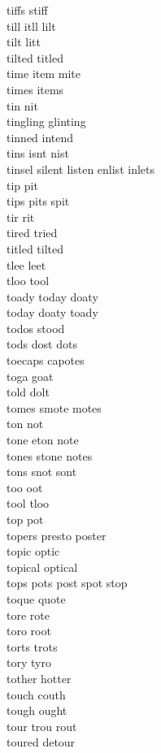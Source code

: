 tiffs stiff\\
till itll lilt\\
tilt litt\\
tilted titled\\
time item mite\\
times items\\
tin nit\\
tingling glinting\\
tinned intend\\
tins isnt nist\\
tinsel silent listen enlist inlets\\
tip pit\\
tips pits spit\\
tir rit\\
tired tried\\
titled tilted\\
tlee leet\\
tloo tool\\
toady today doaty\\
today doaty toady\\
todos stood\\
tods dost dots\\
toecaps capotes\\
toga goat\\
told dolt\\
tomes smote motes\\
ton not\\
tone eton note\\
tones stone notes\\
tons snot sont\\
too oot\\
tool tloo\\
top pot\\
topers presto poster\\
topic optic\\
topical optical\\
tops pots post spot stop\\
toque quote\\
tore rote\\
toro root\\
torts trots\\
tory tyro\\
tother hotter\\
touch couth\\
tough ought\\
tour trou rout\\
toured detour\\

